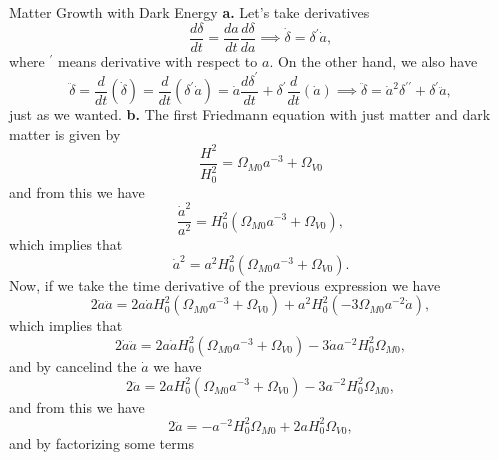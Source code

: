 \documentclass[11pt]{article}
\begin{document}
\begin{problem}
Matter Growth with Dark Energy
\newline
\textbf{a.} Let's take derivatives
\begin{displaymath}
  \frac{d\delta}{dt} = \frac{da}{dt}\frac{d\delta}{da}\implies \dot\delta=\delta^\prime \dot a,
\end{displaymath}
where $^\prime$ means derivative with respect to $a$. On the other hand, we also have
\begin{displaymath}
  \ddot \delta = \frac{d}{dt}(\dot\delta) = \frac{d}{dt}(\delta^\prime \dot a) = \dot a\frac{d\delta^\prime}{dt} + \delta^\prime\frac{d}{dt}(\dot a) \implies \ddot\delta =  \dot a^2\delta^{\prime\prime} + \delta^\prime\ddot a,
\end{displaymath}
just as we wanted.
\newline
\textbf{b.} The first Friedmann equation with just matter and dark matter is given by
\begin{displaymath}
  \frac{H^2}{H_0^2} = \Omega_{M0} a^{-3} + \Omega_{V0}
\end{displaymath}
and from this we have
\begin{displaymath}
  \frac{\dot a^2}{a^2} = H_0^2\left(\Omega_{M0} a^{-3} + \Omega_{V0} \right),
\end{displaymath}
which implies that 
\begin{displaymath}
\dot a^2= a^2 H_0^2\left(\Omega_{M0} a^{-3} + \Omega_{V0} \right).
\end{displaymath}
Now, if we take the time derivative of the previous expression we have
\begin{displaymath}
2\dot a\ddot a = 2a\dot aH_0^2\left(\Omega_{M0} a^{-3} + \Omega_{V0} \right) + a^2H_0^2(-3\Omega_{M0} a^{-2} \dot a),
\end{displaymath}
which implies that
\begin{displaymath}
2\dot a\ddot a = 2a\dot aH_0^2\left(\Omega_{M0} a^{-3} + \Omega_{V0} \right) - 3\dot a a^{-2}H_0^2\Omega_{M0},
\end{displaymath}
and by cancelind the $\dot a$ we have
\begin{displaymath}
2\ddot a = 2aH_0^2\left(\Omega_{M0} a^{-3} + \Omega_{V0} \right) - 3 a^{-2}H_0^2\Omega_{M0}, 
\end{displaymath}
and from this we have
\begin{displaymath}
2\ddot a = -a^{-2}H_0^2\Omega_{M0} + 2aH_0^2\Omega_{V0},
\end{displaymath}
and by factorizing some terms 
\begin{displaymath}

\end{displaymath}
\end{problem}
\end{document}
